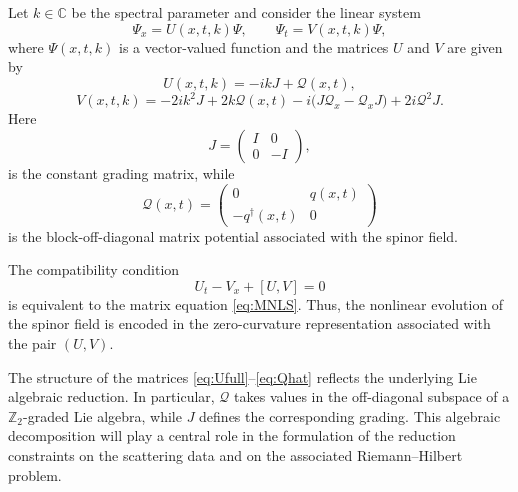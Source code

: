 \documentclass[11pt]{amsart}
\theoremstyle{definition}
\numberwithin{equation}{section}
\begin{document}
Let $k\in\mathbb C$ be the spectral parameter and consider the linear system
\begin{equation}
\Psi_x = U(x,t,k)\Psi, \qquad \Psi_t = V(x,t,k)\Psi,
\label{eq:LaxPairFull}
\end{equation}
where $\Psi(x,t,k)$ is a vector-valued function and the matrices $U$ and $V$ are given by
\begin{equation}
U(x,t,k) = -ikJ + \mathcal Q(x,t),
\label{eq:Ufull}
\end{equation}
\begin{equation}
V(x,t,k) = -2ik^2 J + 2k \mathcal Q(x,t) - i\bigl(J\mathcal Q_x - \mathcal Q_x J\bigr) + 2i\mathcal Q^2 J.
\label{eq:Vfull}
\end{equation}
Here
\begin{equation}
J = \begin{pmatrix}
I & 0 \\
0 & -I
\end{pmatrix},
\label{eq:Jmatrix}
\end{equation}
is the constant grading matrix, while
\begin{equation}
\mathcal Q(x,t)=
\begin{pmatrix}
0 & q(x,t) \\
- q^\dagger(x,t) & 0
\end{pmatrix}
\label{eq:Qhat}
\end{equation}
is the block-off-diagonal matrix potential associated with the spinor field.

The compatibility condition
\begin{equation}
U_t - V_x + [U,V] = 0
\label{eq:ZeroCurvature}
\end{equation}
is equivalent to the matrix equation \eqref{eq:MNLS}. Thus, the nonlinear evolution of the spinor field is encoded in the zero-curvature representation associated with the pair $(U,V)$.

The structure of the matrices \eqref{eq:Ufull}--\eqref{eq:Qhat} reflects the underlying Lie algebraic reduction. In particular, $\mathcal Q$ takes values in the off-diagonal subspace of a $\mathbb Z_2$-graded Lie algebra, while $J$ defines the corresponding grading. This algebraic decomposition will play a central role in the formulation of the reduction constraints on the scattering data and on the associated Riemann--Hilbert problem.
\end{document}
